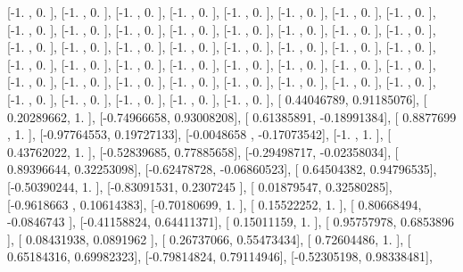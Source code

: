 \documentclass{article}
\begin{document}
       [-1.        ,  0.        ],
       [-1.        ,  0.        ],
       [-1.        ,  0.        ],
       [-1.        ,  0.        ],
       [-1.        ,  0.        ],
       [-1.        ,  0.        ],
       [-1.        ,  0.        ],
       [-1.        ,  0.        ],
       [-1.        ,  0.        ],
       [-1.        ,  0.        ],
       [-1.        ,  0.        ],
       [-1.        ,  0.        ],
       [-1.        ,  0.        ],
       [-1.        ,  0.        ],
       [-1.        ,  0.        ],
       [-1.        ,  0.        ],
       [-1.        ,  0.        ],
       [-1.        ,  0.        ],
       [-1.        ,  0.        ],
       [-1.        ,  0.        ],
       [-1.        ,  0.        ],
       [-1.        ,  0.        ],
       [-1.        ,  0.        ],
       [-1.        ,  0.        ],
       [-1.        ,  0.        ],
       [-1.        ,  0.        ],
       [-1.        ,  0.        ],
       [-1.        ,  0.        ],
       [-1.        ,  0.        ],
       [-1.        ,  0.        ],
       [-1.        ,  0.        ],
       [-1.        ,  0.        ],
       [-1.        ,  0.        ],
       [-1.        ,  0.        ],
       [-1.        ,  0.        ],
       [-1.        ,  0.        ],
       [-1.        ,  0.        ],
       [-1.        ,  0.        ],
       [-1.        ,  0.        ],
       [-1.        ,  0.        ],
       [-1.        ,  0.        ],
       [-1.        ,  0.        ],
       [-1.        ,  0.        ],
       [-1.        ,  0.        ],
       [-1.        ,  0.        ],
       [ 0.44046789,  0.91185076],
       [ 0.20289662,  1.        ],
       [-0.74966658,  0.93008208],
       [ 0.61385891, -0.18991384],
       [ 0.8877699 ,  1.        ],
       [-0.97764553,  0.19727133],
       [-0.0048658 , -0.17073542],
       [-1.        ,  1.        ],
       [ 0.43762022,  1.        ],
       [-0.52839685,  0.77885658],
       [-0.29498717, -0.02358034],
       [ 0.89396644,  0.32253098],
       [-0.62478728, -0.06860523],
       [ 0.64504382,  0.94796535],
       [-0.50390244,  1.        ],
       [-0.83091531,  0.2307245 ],
       [ 0.01879547,  0.32580285],
       [-0.9618663 ,  0.10614383],
       [-0.70180699,  1.        ],
       [ 0.15522252,  1.        ],
       [ 0.80668494, -0.0846743 ],
       [-0.41158824,  0.64411371],
       [ 0.15011159,  1.        ],
       [ 0.95757978,  0.6853896 ],
       [ 0.08431938,  0.0891962 ],
       [ 0.26737066,  0.55473434],
       [ 0.72604486,  1.        ],
       [ 0.65184316,  0.69982323],
       [-0.79814824,  0.79114946],
       [-0.52305198,  0.98338481],
\end{document}
